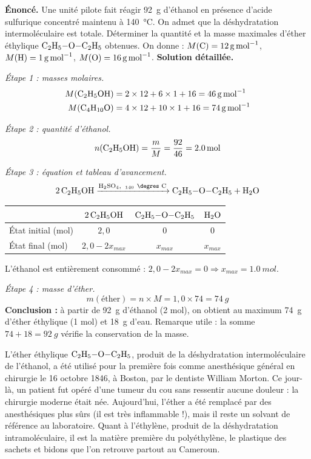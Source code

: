 \documentclass[11pt]{article}
\begin{document}
\begin{exoresolu}
\textbf{Énoncé.} Une unité pilote fait réagir \SI{92}{g} d'éthanol en présence d'acide sulfurique concentré maintenu à \SI{140}{\celsius}. On admet que la déshydratation intermoléculaire est totale. Déterminer la quantité et la masse maximales d'éther éthylique $\ce{C2H5-O-C2H5}$ obtenues. On donne : $M(\ce{C}) = \SI{12}{g.mol^{-1}}$, $M(\ce{H}) = \SI{1}{g.mol^{-1}}$, $M(\ce{O}) = \SI{16}{g.mol^{-1}}$.
\tcblower
\textbf{Solution détaillée.}

\emph{Étape 1 : masses molaires.}
\begin{align*}
M(\ce{C2H5OH}) &= 2\times 12 + 6\times 1 + 16 = \SI{46}{g.mol^{-1}}\\
M(\ce{C4H10O}) &= 4\times 12 + 10\times 1 + 16 = \SI{74}{g.mol^{-1}}
\end{align*}

\emph{Étape 2 : quantité d'éthanol.}
\[ n(\ce{C2H5OH}) = \frac{m}{M} = \frac{92}{46} = \SI{2,0}{mol} \]

\emph{Étape 3 : équation et tableau d'avancement.}
\[ \ce{2 C2H5OH ->[H2SO4,\ 140\ \text{\degres C}] C2H5-O-C2H5 + H2O} \]
\begin{center}
\begin{tabular}{lccc}
\hline
 & $\ce{2 C2H5OH}$ & $\ce{C2H5-O-C2H5}$ & $\ce{H2O}$ \\
\hline
État initial (mol) & $2,0$ & $0$ & $0$ \\
État final (mol) & $2,0 - 2x_{max}$ & $x_{max}$ & $x_{max}$ \\
\hline
\end{tabular}
\end{center}
L'éthanol est entièrement consommé : $2,0 - 2x_{max} = 0 \Rightarrow x_{max} = \SI{1,0}{mol}$.

\emph{Étape 4 : masse d'éther.}
\[ m(\text{éther}) = n \times M = 1,0 \times 74 = \SI{74}{g} \]
\textbf{Conclusion :} à partir de \SI{92}{g} d'éthanol (2 mol), on obtient au maximum \SI{74}{g} d'éther éthylique (1 mol) et \SI{18}{g} d'eau. Remarque utile : la somme $74 + 18 = \SI{92}{g}$ vérifie la conservation de la masse.
\end{exoresolu}

\begin{savaistu}
L'éther éthylique $\ce{C2H5-O-C2H5}$, produit de la déshydratation intermoléculaire de l'éthanol, a été utilisé pour la première fois comme anesthésique général en chirurgie le 16 octobre 1846, à Boston, par le dentiste William Morton. Ce jour-là, un patient fut opéré d'une tumeur du cou sans ressentir aucune douleur : la chirurgie moderne était née. Aujourd'hui, l'éther a été remplacé par des anesthésiques plus sûrs (il est très inflammable !), mais il reste un solvant de référence au laboratoire. Quant à l'éthylène, produit de la déshydratation intramoléculaire, il est la matière première du polyéthylène, le plastique des sachets et bidons que l'on retrouve partout au Cameroun.
\end{savaistu}
\end{document}
